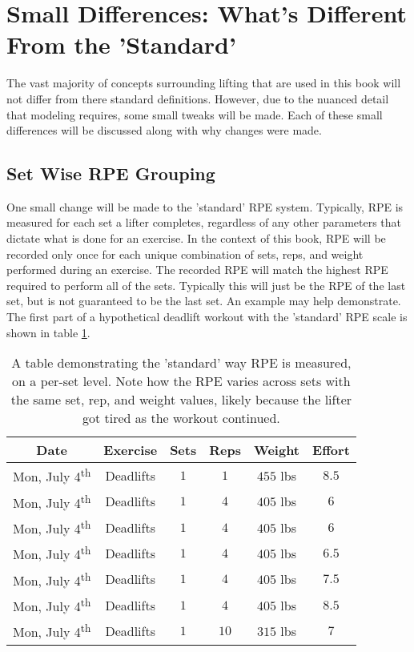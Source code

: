 \section{Small Differences: What's Different From the 'Standard'}
\label{sec:SmallDifferencesSection}

The vast majority of concepts surrounding lifting that are used in this book will not differ from there standard definitions. However, due to the nuanced detail that modeling requires, some small tweaks will be made. Each of these small differences will be discussed along with why changes were made.

\subsection{Set Wise RPE Grouping}
\label{sec:SetWiseRPEGrouping}

One small change will be made to the 'standard' RPE system. Typically, RPE is measured for each set a lifter completes, regardless of any other parameters that dictate what is done for an exercise. In the context of this book, RPE will be recorded only once for each unique combination of sets, reps, and weight performed during an exercise. The recorded RPE will match the highest RPE required to perform all of the sets. Typically this will just be the RPE of the last set, but is not guaranteed to be the last set. An example may help demonstrate. The first part of a hypothetical deadlift workout with the 'standard' RPE scale is shown in table \ref{tab:StandardRPEExample}.

\begin{table}[h]
	\centering
	\begin{tabular}{c|c|c|c|c|c}
		Date & Exercise & Sets & Reps & Weight & Effort \\
        \hline
        Mon, July 4\textsuperscript{th} & Deadlifts & $1$ & $1$ & $455$ lbs & $8.5$ \\
        Mon, July 4\textsuperscript{th} & Deadlifts & $1$ & $4$ & $405$ lbs & $6$ \\
        Mon, July 4\textsuperscript{th} & Deadlifts & $1$ & $4$ & $405$ lbs & $6$ \\
        Mon, July 4\textsuperscript{th} & Deadlifts & $1$ & $4$ & $405$ lbs & $6.5$ \\
        Mon, July 4\textsuperscript{th} & Deadlifts & $1$ & $4$ & $405$ lbs & $7.5$ \\
        Mon, July 4\textsuperscript{th} & Deadlifts & $1$ & $4$ & $405$ lbs & $8.5$ \\
        Mon, July 4\textsuperscript{th} & Deadlifts & $1$ & $10$ & $315$ lbs & $7$ \\
	\end{tabular}
	\caption{A table demonstrating the 'standard' way RPE is measured, on a per-set level. Note how the RPE varies across sets with the same set, rep, and weight values, likely because the lifter got tired as the workout continued.}
	\label{tab:StandardRPEExample}
\end{table}

